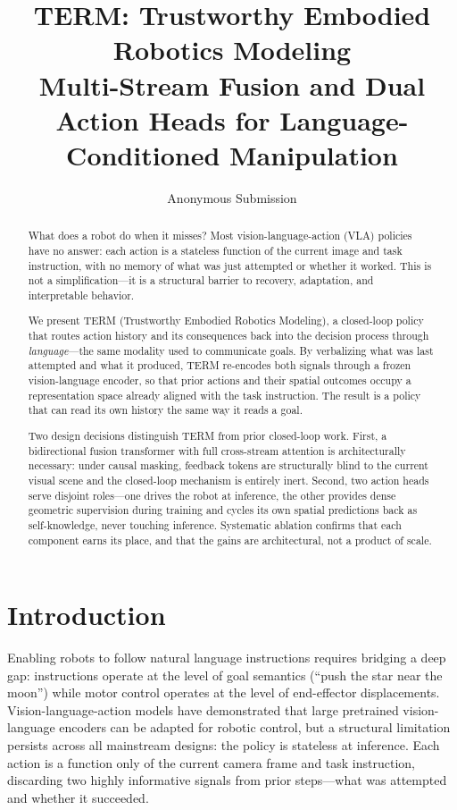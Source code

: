 \documentclass[letterpaper]{article} %
\title{TERM: Trustworthy Embodied Robotics Modeling\\Multi-Stream Fusion and Dual Action Heads for Language-Conditioned Manipulation}
\author{Anonymous Submission}
\begin{document}
\maketitle

\begin{abstract}
What does a robot do when it misses? Most vision-language-action (VLA) policies have no answer: each action is a stateless function of the current image and task instruction, with no memory of what was just attempted or whether it worked. This is not a simplification---it is a structural barrier to recovery, adaptation, and interpretable behavior.

We present TERM (Trustworthy Embodied Robotics Modeling), a closed-loop policy that routes action history and its consequences back into the decision process through \emph{language}---the same modality used to communicate goals. By verbalizing what was last attempted and what it produced, TERM re-encodes both signals through a frozen vision-language encoder, so that prior actions and their spatial outcomes occupy a representation space already aligned with the task instruction. The result is a policy that can read its own history the same way it reads a goal.

Two design decisions distinguish TERM from prior closed-loop work. First, a bidirectional fusion transformer with full cross-stream attention is architecturally necessary: under causal masking, feedback tokens are structurally blind to the current visual scene and the closed-loop mechanism is entirely inert. Second, two action heads serve disjoint roles---one drives the robot at inference, the other provides dense geometric supervision during training and cycles its own spatial predictions back as self-knowledge, never touching inference. Systematic ablation confirms that each component earns its place, and that the gains are architectural, not a product of scale.
\end{abstract}

\section{Introduction}

Enabling robots to follow natural language instructions requires bridging a deep gap: instructions operate at the level of goal semantics (``push the star near the moon'') while motor control operates at the level of end-effector displacements. Vision-language-action models \cite{brohan2023rt2,black2024pi0,kim2024openvla} have demonstrated that large pretrained vision-language encoders can be adapted for robotic control, but a structural limitation persists across all mainstream designs: the policy is stateless at inference. Each action is a function only of the current camera frame and task instruction, discarding two highly informative signals from prior steps---what was attempted and whether it succeeded.
\end{document}
